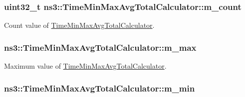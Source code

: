 \subsubsection[{\texorpdfstring{m\+\_\+count}{m_count}}]{\setlength{\rightskip}{0pt plus 5cm}uint32\+\_\+t ns3\+::\+Time\+Min\+Max\+Avg\+Total\+Calculator\+::m\+\_\+count\hspace{0.3cm}{\ttfamily [protected]}}\hypertarget{classns3_1_1TimeMinMaxAvgTotalCalculator_a6c8fe30f4d4e31413fdb9bab9bfe51d7}{}\label{classns3_1_1TimeMinMaxAvgTotalCalculator_a6c8fe30f4d4e31413fdb9bab9bfe51d7}


Count value of \hyperlink{classns3_1_1TimeMinMaxAvgTotalCalculator}{Time\+Min\+Max\+Avg\+Total\+Calculator}. 

\subsubsection[{\texorpdfstring{m\+\_\+max}{m_max}}]{ ns3\+::\+Time\+Min\+Max\+Avg\+Total\+Calculator\+::m\+\_\+max\hspace{0.3cm}{\ttfamily [protected]}}\hypertarget{classns3_1_1TimeMinMaxAvgTotalCalculator_af364c5c25cfa46a37af468c2c63ba79e}{}\label{classns3_1_1TimeMinMaxAvgTotalCalculator_af364c5c25cfa46a37af468c2c63ba79e}


Maximum value of \hyperlink{classns3_1_1TimeMinMaxAvgTotalCalculator}{Time\+Min\+Max\+Avg\+Total\+Calculator}. 

\subsubsection[{\texorpdfstring{m\+\_\+min}{m_min}}]{ ns3\+::\+Time\+Min\+Max\+Avg\+Total\+Calculator\+::m\+\_\+min\hspace{0.3cm}{\ttfamily [protected]}}\hypertarget{classns3_1_1TimeMinMaxAvgTotalCalculator_a844eca59dec93d49dfa06397da38ea7d}{}\label{classns3_1_1TimeMinMaxAvgTotalCalculator_a844eca59dec93d49dfa06397da38ea7d}


